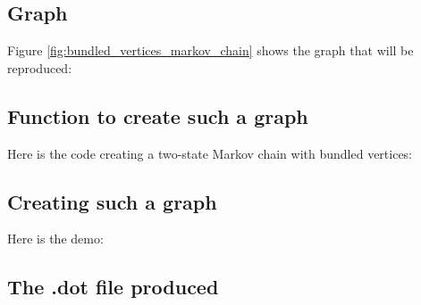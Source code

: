 \subsection{Graph}

Figure \ref{fig:bundled_vertices_markov_chain} 
shows the graph that will be reproduced:

%
%

\subsection{Function to create such a graph}

Here is the code creating a two-state Markov chain with bundled vertices:



\subsection{Creating such a graph}

Here is the demo:



\subsection{The .dot file produced}

